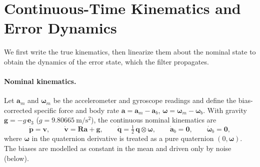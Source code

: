 \documentclass[11pt]{article}
\newcommand{\R}{\mathbf{R}}
\newcommand{\bp}{\mathbf{p}}
\newcommand{\bv}{\mathbf{v}}
\newcommand{\ba}{\mathbf{a}}
\newcommand{\bg}{\mathbf{g}}
\newcommand{\be}{\mathbf{e}}
\newcommand{\bomega}{\bm{\omega}}
\newcommand{\bq}{\mathbf{q}}
\begin{document}
\section{Continuous-Time Kinematics and Error Dynamics}
\label{sec:kin}

We first write the true kinematics, then linearize them about the nominal state to obtain the dynamics
of the error state, which the filter propagates.

\paragraph{Nominal kinematics.}
Let $\ba_m$ and $\bomega_m$ be the accelerometer and gyroscope readings and define the bias-corrected
specific force and body rate $\ba = \ba_m - \ba_b$, $\bomega = \bomega_m - \bomega_b$. With gravity
$\bg = -g\,\be_3$ ($g=\SI{9.80665}{\metre\per\second\squared}$), the continuous nominal kinematics are
\begin{equation}
  \dot{\bp} = \bv, \qquad
  \dot{\bv} = \R\ba + \bg, \qquad
  \dot{\bq} = \tfrac12\,\bq \otimes \bomega, \qquad
  \dot{\ba}_b = \mathbf{0}, \qquad
  \dot{\bomega}_b = \mathbf{0},
  \label{eq:nomkin}
\end{equation}
where $\bomega$ in the quaternion derivative is treated as a pure quaternion $(0,\bomega)$. The biases
are modelled as constant in the mean and driven only by noise (below).
\end{document}
